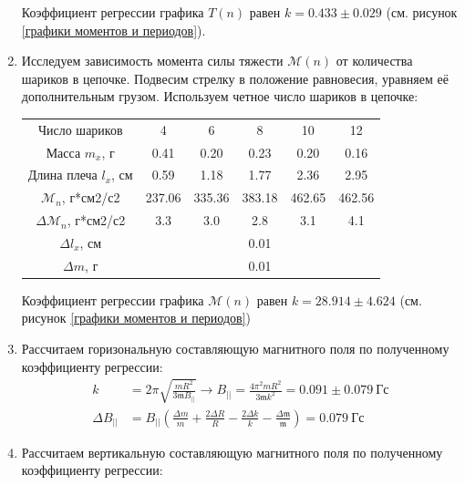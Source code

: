 \documentclass[a4paper, 10pt]{article}
\begin{document}
\begin{enumerate}
\begin{center}
\begin{tabular}{|c|c|c|c|c|c|c|c|c|c|c|}
        \end{tabular}
    \end{center}
    Коэффициент регрессии графика $T(n)$ равен $k = 0.433\pm 0.029$ (см. рисунок \ref{графики моментов и периодов}).
    \item Исследуем зависимость момента силы тяжести $\mathcal{M}(n)$ от количества шариков в цепочке. Подвесим стрелку в положение равновесия, уравняем её дополнительным грузом. Используем четное число шариков в цепочке:
    \begin{center}
        \begin{tabular}{|c|c|c|c|c|c|}
            \hline
            Число шариков & 4 & 6 & 8 & 10 & 12\\
            Масса $m_{x}$, г & 0.41 & 0.20 & 0.23 & 0.20 & 0.16\\
            Длина плеча $l_{x}$, см & 0.59 & 1.18 & 1.77 & 2.36 & 2.95\\
            $\mathcal{M}_{n}$, г*см2/с2 & 237.06 & 335.36 & 383.18 & 462.65 & 462.56\\
            $\Delta \mathcal{M}_{n}$, г*см2/с2 & 3.3 & 3.0 & 2.8 & 3.1 & 4.1\\
            \hline
            $\Delta l_{x}$, см & \multicolumn{5}{|c|}{0.01}\\
            $\Delta m$, г & \multicolumn{5}{|c|}{0.01}\\
            \hline
        \end{tabular}
        \label{дополнительный груз для магнитной стрелки}
    \end{center}
    Коэффициент регрессии графика $\mathcal{M}(n)$ равен $k = 28.914\pm 4.624$ (см. рисунок \ref{графики моментов и периодов})
    \item Рассчитаем горизональную составляющую магнитного поля по полученному коэффициенту регрессии:
    \begin{align*}
        k & = 2\pi \sqrt{\frac{mR^{2}}{3\mathfrak{m}{B_{||}}}} \rightarrow {B_{||}} = \frac{4\pi^{2}mR^{2}}{3\mathfrak{m}k^{2}} = 0.091\pm 0.079\ \text{Гс}\\
        \Delta {B_{||}} & = {B_{||}}\left(\frac{\Delta m}{m} + \frac{2\Delta R}{R} - \frac{2\Delta k}{k} - \frac{\Delta \mathfrak{m}}{\mathfrak{m}}\right) = 0.079\ \text{Гс}
    \end{align*}
    \item Рассчитаем вертикальную составляющую магнитного поля по полученному коэффициенту регрессии:

\end{enumerate}
\end{document}
